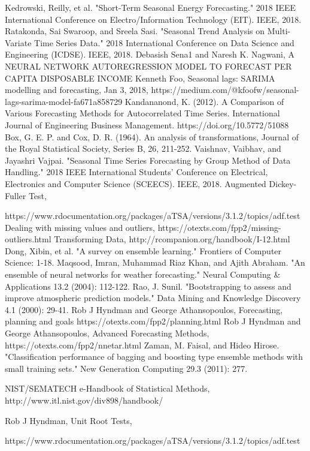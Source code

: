 \documentclass[runningheads]{llncs}
\begin{document}
\begin{thebibliography}{8}
Kedrowski, Reilly, et al. "Short-Term Seasonal Energy Forecasting." 2018 IEEE International Conference on Electro/Information Technology (EIT). IEEE, 2018.
Ratakonda, Sai Swaroop, and Sreela Sasi. "Seasonal Trend Analysis on Multi-Variate Time Series Data." 2018 International Conference on Data Science and Engineering (ICDSE). IEEE, 2018.
 Debasish Sena1
 and Naresh K. Nagwani, A NEURAL NETWORK AUTOREGRESSION MODEL TO FORECAST
PER CAPITA DISPOSABLE INCOME 
 Kenneth Foo, Seasonal lags: SARIMA modelling and forecasting, Jan 3, 2018, 
https://medium.com/@kfoofw/seasonal-lags-sarima-model-fa671a858729
  Kandananond, K. (2012). A Comparison of Various Forecasting Methods for Autocorrelated Time Series. International Journal of Engineering Business Management. https://doi.org/10.5772/51088
 Box, G. E. P. and Cox, D. R. (1964). An analysis of transformations, Journal of the Royal Statistical Society, Series B, 26, 211-252.
Vaishnav, Vaibhav, and Jayashri Vajpai. "Seasonal Time Series Forecasting by Group Method of Data Handling." 2018 IEEE International Students' Conference on Electrical, Electronics and Computer Science (SCEECS). IEEE, 2018.
Augmented Dickey-Fuller Test,

https://www.rdocumentation.org/packages/aTSA/versions/3.1.2/topics/adf.test
 Dealing with missing values and outliers,
https://otexts.com/fpp2/missing-outliers.html
 Transforming Data,
http://rcompanion.org/handbook/I-12.html
Dong, Xibin, et al. "A survey on ensemble learning." Frontiers of Computer Science: 1-18.
Maqsood, Imran, Muhammad Riaz Khan, and Ajith Abraham. "An ensemble of neural networks for weather forecasting." Neural Computing \& Applications 13.2 (2004): 112-122.
Rao, J. Sunil. "Bootstrapping to assess and improve atmospheric prediction models." Data Mining and Knowledge Discovery 4.1 (2000): 29-41.
Rob J Hyndman and George Athansopoulos, Forecasting, planning and goals
https://otexts.com/fpp2/planning.html 
 Rob J Hyndman and George Athansopoulos, Advanced Forecasting Methods,
https://otexts.com/fpp2/nnetar.html
Zaman, M. Faisal, and Hideo Hirose. "Classification performance of bagging and boosting type ensemble methods with small training sets." New Generation Computing 29.3 (2011): 277.

 NIST/SEMATECH e-Handbook of Statistical Methods, http://www.itl.nist.gov/div898/handbook/

 Rob J Hyndman, Unit Root Tests,

https://www.rdocumentation.org/packages/aTSA/versions/3.1.2/topics/adf.test


\end{thebibliography}
\end{document}
